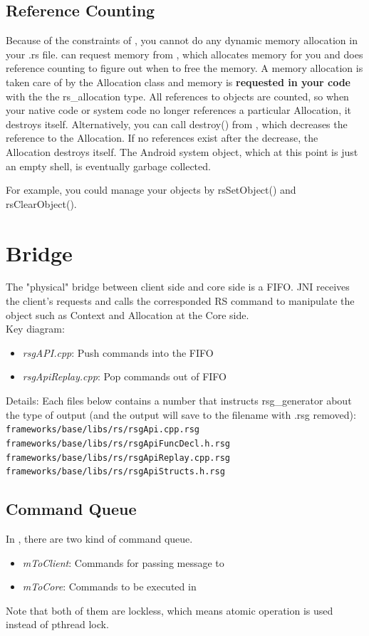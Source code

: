 \subsection{Reference Counting}
\label{refcounting}
Because of the constraints of \Core{}, you cannot do any dynamic memory allocation in your \RS{} .rs file. \Core{} can request memory from \Client{}, which allocates memory for you and does reference counting to figure out when to free the memory. A memory allocation is taken care of by the Allocation class and memory is \textbf{requested in your \RS{} code} with the the rs\_allocation type. 
All references to \RS{} objects are counted, so when your \RS{} native code or system code no longer references a particular Allocation, it destroys itself. Alternatively, you can call destroy() from \Client{}, which decreases the reference to the Allocation. If no references exist after the decrease, the Allocation destroys itself. The Android system object, which at this point is just an empty shell, is eventually garbage collected.

For example, you could manage your objects by rsSetObject() and rsClearObject()\cite{native-rs-api}.

\section{Bridge}
\label{s:Bridge}
The "physical" bridge between client side and core side is a FIFO. JNI receives the client's requests and calls the corresponded RS command to manipulate the object such as Context and Allocation at the Core side.\\
Key diagram: 
\begin{itemize}
	\item \textit{rsgAPI.cpp}: Push commands into the FIFO
	\item \textit{rsgApiReplay.cpp}: Pop commands out of FIFO
\end{itemize}
Details: Each files below contains a number that instructs rsg\_generator about the type of output (and the output will save to the filename with .rsg removed):
\\
\verb|frameworks/base/libs/rs/rsgApi.cpp.rsg|\\ 
\verb|frameworks/base/libs/rs/rsgApiFuncDecl.h.rsg|\\
\verb|frameworks/base/libs/rs/rsgApiReplay.cpp.rsg|\\ 
\verb|frameworks/base/libs/rs/rsgApiStructs.h.rsg|

\subsection{Command Queue}
\label{ss:CommandQueue}
In \RS{}, there are two kind of command queue.
\begin{itemize}
	\item \textit{mToClient}: Commands for passing message to \Client{}
	\item \textit{mToCore}: Commands to be executed in \Core{}
\end{itemize}
Note that both of them are lockless, which means atomic operation is used instead of pthread lock.

